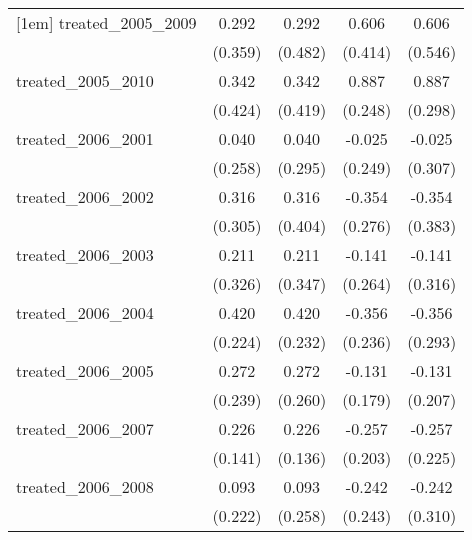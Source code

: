 {\begin{tabular}{l*{4}{c}}
[1em]
treated\_2005\_2009&       0.292         &       0.292         &       0.606         &       0.606         \\
            &     (0.359)         &     (0.482)         &     (0.414)         &     (0.546)         \\
[1em]
treated\_2005\_2010&       0.342         &       0.342         &       0.887\sym{***}&       0.887\sym{**} \\
            &     (0.424)         &     (0.419)         &     (0.248)         &     (0.298)         \\
[1em]
treated\_2006\_2001&       0.040         &       0.040         &      -0.025         &      -0.025         \\
            &     (0.258)         &     (0.295)         &     (0.249)         &     (0.307)         \\
[1em]
treated\_2006\_2002&       0.316         &       0.316         &      -0.354         &      -0.354         \\
            &     (0.305)         &     (0.404)         &     (0.276)         &     (0.383)         \\
[1em]
treated\_2006\_2003&       0.211         &       0.211         &      -0.141         &      -0.141         \\
            &     (0.326)         &     (0.347)         &     (0.264)         &     (0.316)         \\
[1em]
treated\_2006\_2004&       0.420         &       0.420         &      -0.356         &      -0.356         \\
            &     (0.224)         &     (0.232)         &     (0.236)         &     (0.293)         \\
[1em]
treated\_2006\_2005&       0.272         &       0.272         &      -0.131         &      -0.131         \\
            &     (0.239)         &     (0.260)         &     (0.179)         &     (0.207)         \\
[1em]
treated\_2006\_2007&       0.226         &       0.226         &      -0.257         &      -0.257         \\
            &     (0.141)         &     (0.136)         &     (0.203)         &     (0.225)         \\
[1em]
treated\_2006\_2008&       0.093         &       0.093         &      -0.242         &      -0.242         \\
            &     (0.222)         &     (0.258)         &     (0.243)         &     (0.310)         \\

\end{tabular}}
